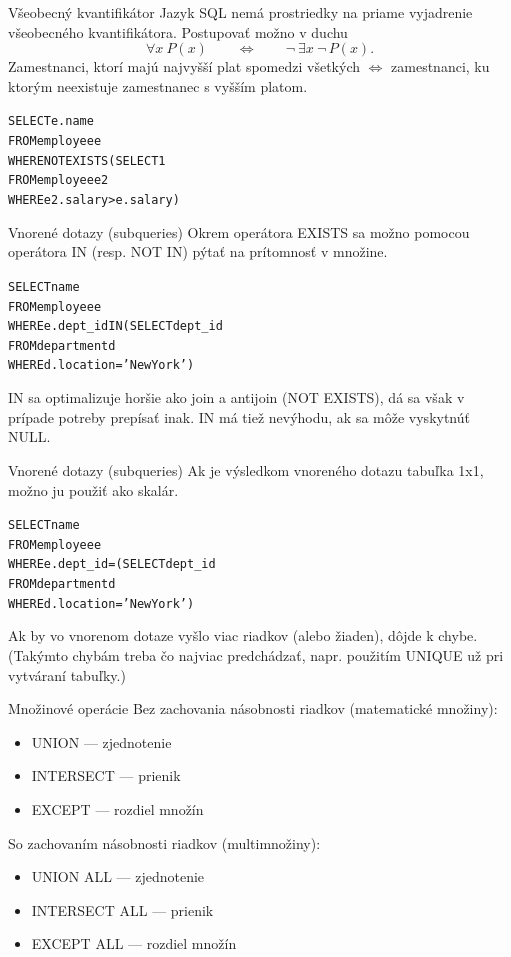 \documentclass[12pt]{beamer}
\def\blue#1{\textcolor{Cerulean}{#1}}
\begin{document}
\begin{frame}[fragile]{Všeobecný kvantifikátor}
Jazyk SQL nemá prostriedky na priame vyjadrenie všeobecného kvantifikátora.
Postupovať možno v duchu
$$
    \forall x\ P(x)\qquad \Leftrightarrow\qquad \lnot\ \exists x\ \lnot\, P(x).
$$
Zamestnanci, ktorí majú najvyšší plat spomedzi \alert{všetkých} $\Leftrightarrow$ zamestnanci, ku ktorým \alert{neexistuje} zamestnanec s vyšším platom.
\begin{alltt}
SELECT e.name
FROM employee e
WHERE \blue{NOT EXISTS} (SELECT 1
                  FROM employee e2
                  WHERE e2.salary > e.salary)
\end{alltt}
\end{frame}

\begin{frame}[fragile]{Vnorené dotazy (subqueries)}
Okrem operátora EXISTS sa možno pomocou operátora IN (resp. NOT IN) pýtať na prítomnosť v množine.
\begin{alltt}
SELECT name
FROM employee e
WHERE e.dept_id \alert{IN} (SELECT dept_id
                   FROM department d
                   WHERE d.location = 'New York')
\end{alltt}
IN sa optimalizuje horšie ako join a antijoin (NOT EXISTS), dá sa však v prípade potreby prepísať inak.
IN má tiež nevýhodu, ak sa môže vyskytnúť NULL.
\end{frame}

\begin{frame}[fragile]{Vnorené dotazy (subqueries)}
Ak je výsledkom vnoreného dotazu tabuľka 1x1, možno ju použiť ako skalár.
\begin{alltt}
SELECT name
FROM employee e
WHERE \alert{e.dept_id =} \blue{(SELECT dept_id
                  FROM department d
                  WHERE d.location = 'New York')}
\end{alltt}
Ak by vo vnorenom dotaze vyšlo viac riadkov (alebo žiaden), dôjde k chybe.\\
(Takýmto chybám treba čo najviac predchádzať, napr. použitím UNIQUE už pri vytváraní tabuľky.)
\end{frame}

\begin{frame}{Množinové operácie}
Bez zachovania násobnosti riadkov (matematické množiny):
\begin{itemize}
\item UNION --- zjednotenie
\item INTERSECT --- prienik
\item EXCEPT --- rozdiel množín
\end{itemize}
So zachovaním násobnosti riadkov (multimnožiny):
\begin{itemize}
\item UNION ALL --- zjednotenie
\item INTERSECT ALL --- prienik
\item EXCEPT ALL --- rozdiel množín
\end{itemize}
\end{frame}
\end{document}

